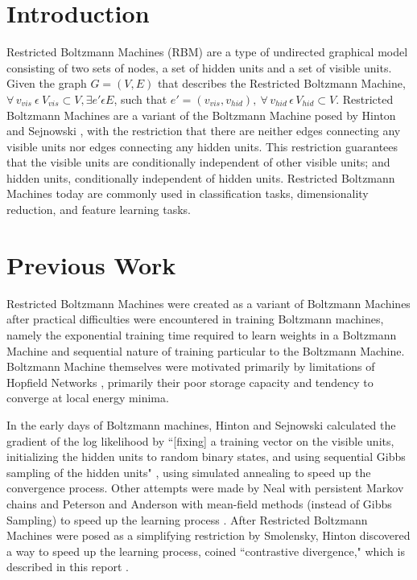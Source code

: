 \documentclass[journal]{IEEEtran}
\begin{document}
\section{Introduction}
Restricted Boltzmann Machines (RBM) are a type of undirected graphical model consisting of two sets of nodes, a set of hidden units and a set of visible units.  Given the graph $G = (V,E)$ that describes the Restricted Boltzmann Machine, $\forall \, v_{vis} \: \epsilon \: V_{vis} \subset V,\exists e'\epsilon E$, such that $ e'=(v_{vis}, v_{hid}),\: \forall \, v_{hid} \, \epsilon \, V_{hid} \subset V$.  Restricted Boltzmann Machines are a variant of the Boltzmann Machine \cite{ackley1985learning} posed by Hinton and Sejnowski  \cite{hinton2006fast}, with the restriction that there are neither edges connecting any visible units nor edges connecting any hidden units.  This restriction guarantees that the visible units are conditionally independent of other visible units; and hidden units, conditionally independent of hidden units. Restricted Boltzmann Machines today are commonly used in classification tasks, dimensionality reduction, and feature learning tasks.

\section{Previous Work}
Restricted Boltzmann Machines were created as a variant of Boltzmann Machines after practical difficulties were encountered in training Boltzmann machines, namely the exponential training time required to learn weights in a Boltzmann Machine and sequential nature of training particular to the Boltzmann Machine.  Boltzmann Machine themselves were motivated primarily by limitations of Hopfield Networks \cite{hopfield1985neural}, primarily their poor storage capacity and tendency to converge at local energy minima.  

In the early days of Boltzmann machines, Hinton and Sejnowski calculated the gradient of the log likelihood by ``[fixing] a training vector on the visible units, initializing the hidden units to random binary states, and using sequential Gibbs sampling of the hidden units" \cite{ackley1985learning}, using simulated annealing to speed up the convergence process.  Other attempts were made by Neal with persistent Markov chains \cite{neal1992connectionist} and Peterson and Anderson with mean-field methods (instead of Gibbs Sampling) to speed up the learning process \cite{peterson1987mean}. After Restricted Boltzmann Machines were posed as a simplifying restriction by Smolensky, Hinton discovered a way to speed up the learning process, coined ``contrastive divergence," which is described in this report \cite{hinton2006fast,hinton2010practical}.
\end{document}
